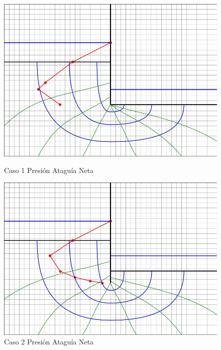 \begin{figure}[H]
    \centering
    \begin{minipage}{0.32\textwidth}
        \centering
        \includegraphics[width=\textwidth]{GRAFICOS/caso_1_presion_ataguia_neta.jpg}
        \caption{Caso 1 Presión Ataguía Neta}
        \label{fig:caso_1_presion_ataguia_neta}
    \end{minipage}
    \begin{minipage}{0.32\textwidth}
        \centering
        \includegraphics[width=\textwidth]{GRAFICOS/caso_2_presion_ataguia_neta.jpg}
        \caption{Caso 2 Presión Ataguía Neta}
        \label{fig:caso_2_presion_ataguia_neta}
    \end{minipage}
    \begin{minipage}{0.32\textwidth}

\end{minipage}
\end{figure}
